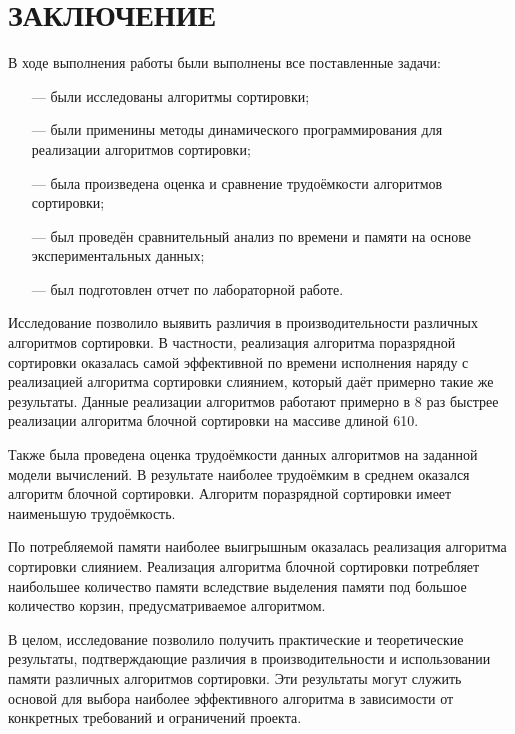 \chapter*{ЗАКЛЮЧЕНИЕ}

В ходе выполнения работы были выполнены все поставленные задачи:
\begin{itemize}
	\item[---] были исследованы алгоритмы сортировки;
	\item[---] были применины методы динамического программирования для реализации алгоритмов сортировки;
	\item[---] была произведена оценка и сравнение трудоёмкости алгоритмов сортировки;
	\item[---] был проведён сравнительный анализ по времени и памяти на основе экспериментальных данных;
	\item[---] был подготовлен отчет по лабораторной работе.
\end{itemize}

Исследование позволило выявить различия в производительности различных алгоритмов сортировки. В частности, реализация алгоритма поразрядной сортировки оказалась самой эффективной по времени исполнения наряду с реализацией алгоритма сортировки слиянием, который даёт примерно такие же результаты. Данные реализации алгоритмов работают примерно в 8 раз быстрее реализации алгоритма блочной сортировки на массиве длиной 610.

Также была проведена оценка трудоёмкости данных алгоритмов на заданной модели вычислений. В результате наиболее трудоёмким в среднем оказался алгоритм блочной сортировки. Алгоритм поразрядной сортировки имеет наименьшую трудоёмкость.

По потребляемой памяти наиболее выигрышным оказалась реализация алгоритма сортировки слиянием. Реализация алгоритма блочной сортировки потребляет наибольшее количество памяти вследствие выделения памяти под большое количество корзин, предусматриваемое алгоритмом.

В целом, исследование позволило получить практические и теоретические результаты, подтверждающие различия в производительности и использовании памяти различных алгоритмов сортировки. Эти результаты могут служить основой для выбора наиболее эффективного алгоритма в зависимости от конкретных требований и ограничений проекта.
\pagebreak